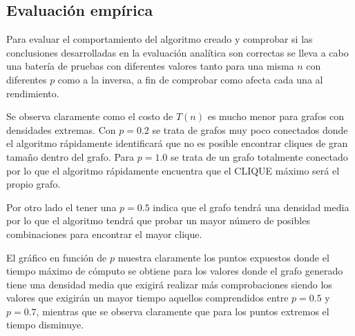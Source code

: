 \subsection*{Evaluación empírica}
Para evaluar el comportamiento del algoritmo creado y comprobar si las conclusiones desarrolladas en la evaluación analítica son correctas se lleva a cabo una batería de pruebas con diferentes valores tanto para una misma $n$ con diferentes $p$ como a la inversa, a fin de comprobar como afecta cada una al rendimiento.


Se observa claramente como el costo de $T(n)$ es mucho menor para grafos con densidades extremas. Con $p=0.2$ se trata de grafos muy poco conectados donde el algoritmo rápidamente identificará que no es posible encontrar cliques de gran tamaño  dentro del grafo. Para $p=1.0$ se trata de un grafo totalmente conectado por lo que el algoritmo rápidamente encuentra que el CLIQUE máximo será el propio grafo.

Por otro lado el tener una $p=0.5$ indica que el grafo tendrá una densidad media por lo que el algoritmo tendrá que probar un mayor número de posibles combinaciones para encontrar el mayor clique.

El gráfico en función de $p$ muestra claramente los puntos expuestos donde el tiempo máximo de cómputo se obtiene para los valores donde el grafo generado tiene una densidad media que exigirá realizar más comprobaciones siendo los valores que exigirán un mayor tiempo aquellos comprendidos entre $p=0.5$ y $p=0.7$, mientras que se observa claramente que para los puntos extremos el tiempo disminuye.
